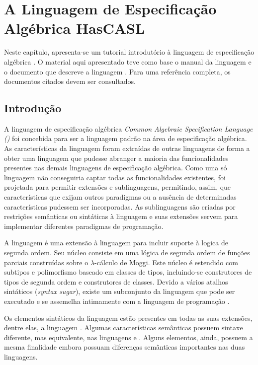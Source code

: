 \chapter{A Linguagem de Especificação Algébrica HasCASL}
\label{chap:HasCASLTutorial}

Neste capítulo, apresenta-se um tutorial introdutório à linguagem de especificação algébrica \HasCASL.
O material aqui apresentado teve como base o manual da linguagem \CASL \citep{CoFI:2004:CASL-RM} e o documento que descreve a linguagem \HasCASL \cite{SchroderMossakowski08}.
Para uma referência completa, os documentos citados devem ser consultados.

\section{Introdução}
A linguagem de especificação algébrica \textit{Common Algebraic Specification Language (\CASL)} foi concebida para ser a linguagem padrão na área de especificação algébrica.
As características da linguagem foram extraídas de outras linguagens de forma a obter uma linguagem que pudesse abranger a maioria das funcionalidades presentes nas demais linguagens de especificação algébrica.
Como uma só linguagem não conseguiria captar todas as funcionalidades existentes, \CASL foi projetada para permitir extensões e sublinguagens, permitindo, assim, que características que exijam outros paradigmas ou a ausência de determinadas características pudessem ser incorporadas.
As sublinguagens são criadas por restrições semânticas ou sintáticas à linguagem \CASL e suas extensões servem para implementar diferentes paradigmas de programação.

A linguagem \HasCASL é uma extensão à linguagem \CASL para incluir suporte à logica de segunda ordem.
Seu núcleo consiste em uma lógica de segunda ordem de funções parciais construídas sobre o $\lambda$-cálculo de Moggi.
Este núcleo é estendido com subtipos e polimorfismo baseado em classes de tipos, incluindo-se construtores de tipos de segunda ordem e construtores de classes.
Devido a vários atalhos sintáticos (\textit{syntax sugar}), existe um subconjunto da linguagem que pode ser executado e se assemelha intimamente com a linguagem de programação \Haskell.

Os elementos sintáticos da linguagem \CASL estão presentes em todas as suas extensões, dentre elas, a linguagem \HasCASL.
Algumas características semânticas possuem sintaxe diferente, mas equivalente, nas linguagens \CASL e \HasCASL.
Alguns elementos, ainda, possuem a mesma finalidade embora possuam diferenças semânticas importantes nas duas linguagens.

